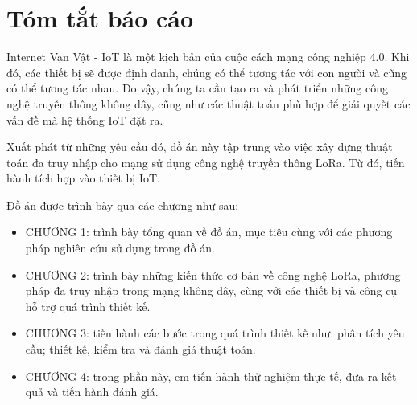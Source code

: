 \chapter*{Tóm tắt báo cáo}
Internet Vạn Vật - IoT là một kịch bản của cuộc cách mạng công nghiệp 4.0. Khi đó, các thiết bị sẽ được định danh, chúng có thể tương tác với con người và cũng có thể tương tác nhau. Do vậy, chúng ta cần tạo ra và phát triển những công nghệ truyền thông không dây, cũng như các thuật toán phù hợp để giải quyết các vấn đề mà hệ thống IoT đặt ra.
\par
Xuất phát từ những yêu cầu đó, đồ án này tập trung vào việc xây dựng thuật toán đa truy nhập cho mạng sử dụng công nghệ truyền thông LoRa. Từ đó, tiến hành tích hợp vào thiết bị IoT.
\par 
Đồ án được trình bày qua các chương như sau:
\begin{itemize}
\item CHƯƠNG 1: trình bày tổng quan về đồ án, mục tiêu cùng với các phương pháp nghiên cứu sử dụng trong đồ án.
\item CHƯƠNG 2: trình bày những kiến thức cơ bản về công nghệ LoRa, phương pháp đa truy nhập trong mạng không dây, cùng với các thiết bị và công cụ hỗ trợ quá trình thiết kế.
\item CHƯƠNG 3: tiến hành các bước trong quá trình thiết kế như: phân tích yêu cầu; thiết kế, kiểm tra và đánh giá thuật toán.
\item CHƯƠNG 4: trong phần này, em tiến hành thử nghiệm thực tế, đưa ra kết quả và tiến hành đánh giá.
\end{itemize}

